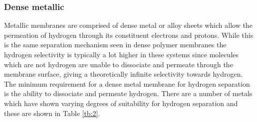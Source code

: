 \subsubsection{Dense metallic}
Metallic membranes are comprised of dense metal or alloy sheets which allow the permeation 
of hydrogen through its constituent electrons and protons. While this is the same separation 
mechanism seen in dense polymer membranes the hydrogen selectivity is typically a lot higher 
in these systems since molecules which are not hydrogen are unable to dissociate and permeate 
through the membrane surface, giving a theoretically infinite selectivity towards hydrogen. 
The minimum requirement for a dense metal membrane for hydrogen separation is the ability to 
dissociate and permeate hydrogen. There are a number of metals which have shown varying 
degrees of suitability for hydrogen separation and these are shown in Table \ref{tb:2}.


